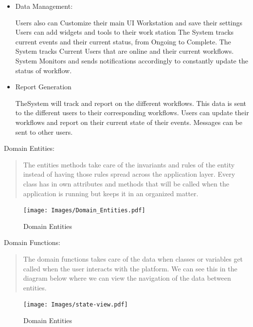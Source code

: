 \documentclass{article}[draft]
\begin{document}
\begin{itemize}
    \item Data Management:

    \vspace{5pt}
    Users also can Customize their main UI Workstation and save their settings
    Users can add widgets and tools to their
    work station
    The System tracks current events and their current status, from Ongoing to Complete.
    The System tracks Current Users that are online and their current workflows.
    System Monitors and sends notifications accordingly to constantly update the status of workflow.
\end{itemize}

\begin{itemize}
    \item Report Generation

    \vspace{5pt}
    TheSystem will track and report on the different workflows.
    This data is sent to the different users to their corresponding workflows.
    Users can
    update their workflows and report on their current state of their events.
    Messages can be sent to other users.
\end{itemize}
\vspace{5pt}
Domain Entities:
\begin{quotation}
    The entities methods take care of the invariants and rules of the entity instead of having those rules spread across the application layer.
    Every class has in own attributes and methods that will be called when the application is running but keeps it in an organized matter.
\end{quotation}
\bigbreak
\begin{figure}[ht!]
    \centering
    \texttt{[image: Images/Domain\_Entities.pdf]}
    \caption{Domain Entities}
    \label{fig:figure}
\end{figure}
\bigbreak
Domain Functions:
\begin{quotation}
    The domain functions takes care of the data when classes or variables get called when the user interacts with the platform.
    We can see this in the diagram below where we can view the navigation of the data between entities.
\end{quotation}
\bigbreak
\begin{figure}[ht!]
    \centering
    \texttt{[image: Images/state-view.pdf]}
    \caption{Domain Entities}
    \label{fig:figure2}
\end{figure}
\bigbreak
\end{document}
